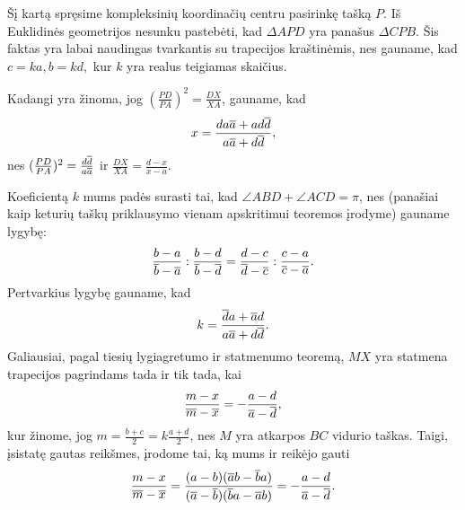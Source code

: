 \documentclass[11pt,a4paper,twoside]{book}
\begin{document}
\begin{sprendimas}
Šį kartą spręsime kompleksinių koordinačių centru pasirinkę tašką $P$. Iš Euklidinės geometrijos
nesunku pastebėti, kad $\Delta APD$ yra panašus $\Delta CPB$. Šis faktas yra labai naudingas tvarkantis su trapecijos kraštinėmis, nes gauname, kad $c=ka,  b=kd,$ kur $k$ yra realus teigiamas skaičius.

Kadangi yra žinoma, jog $ ( \frac {PD}{PA})^2 = \frac {DX}{XA} $, gauname, kad 
$$ x = \frac { da \overline a + ad \overline d }{ a \overline a + d \overline d},$$
nes $ ( \frac {PD}{PA})^2 =\frac {d \overline d} {a \overline a} $ ir $\frac {DX}{XA} = \frac{d-x}{x-a}.$

Koeficientą $k$ mums padės surasti tai, kad $ \angle ABD + \angle ACD = \pi $, nes (panašiai kaip keturių taškų priklausymo vienam apskritimui teoremos įrodyme) gauname lygybę:
$$\frac {b-a}{\overline b - \overline a} : \frac { b-d}{\overline b - \overline d} =  \frac {d-c}{\overline d - \overline c} : \frac { c-a}{\overline c- \overline a}.$$
Pertvarkius lygybę gauname, kad 
$$ k =  \frac { \overline d a + \overline a d }{a \overline a + d \overline d}. $$
Galiausiai, pagal tiesių lygiagretumo ir statmenumo teoremą, $MX$ yra statmena trapecijos pagrindams tada ir tik tada, kai
 $$  \frac {m-x}{ \overline m - \overline x} = - \frac {a - d}{ \overline a - \overline d},$$
kur žinome, jog $ m =\frac{b+c}{2}= k \frac { a+d} { 2} $, nes $M$ yra atkarpos $BC$ vidurio taškas. Taigi, įsistatę gautas reikšmes, įrodome tai, ką mums ir reikėjo gauti
$$ \frac {m-x}{ \overline m - \overline x}= 
\frac {(a-b)( \overline a b - \overline b a) }{(\overline a- \overline b)( \overline b a - \overline a b) } = - \frac {a - d}{ \overline a - \overline d}.$$
\end{sprendimas}
\end{document}
